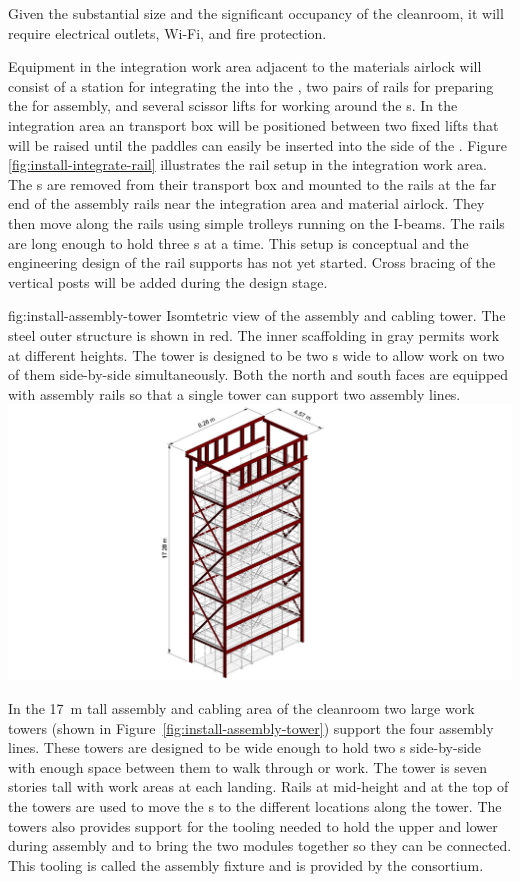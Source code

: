 Given the substantial size and the significant occupancy of the cleanroom, it will require electrical outlets, Wi-Fi, and fire protection. 

Equipment in the integration work area adjacent to the materials airlock will consist of a station for integrating the  into the , two pairs of rails for preparing the  for assembly, and several scissor lifts for working around the s. 
In the  integration area an  transport box will be positioned between two fixed lifts that will be raised until the  paddles can easily be inserted into the side of the . 
Figure \ref{fig:install-integrate-rail} illustrates the rail setup in the integration work area. 
The s are removed from their transport box and mounted to the rails at the far end of the assembly rails near the  integration area and material airlock. 
They then move along the rails using simple trolleys running on the I-beams. 
The rails are long enough to hold three s at a time. 
This setup is conceptual and the engineering design of the rail supports has not yet started. 
Cross bracing of the vertical posts will be added during the design stage. 

\begin{dunefigure}{fig:install-assembly-tower}
  {
  Isomtetric view of the  assembly and cabling tower. The steel outer structure is shown in red. The inner scaffolding in gray permits work at different heights.
  The tower is designed to be two s wide to allow work on two of them side-by-side simultaneously. 
  Both the north and south faces are equipped with assembly rails so that 
   a single tower can support two assembly lines.
  }
\includegraphics[width=.5\textwidth]{graphics/install-assembly-tower.pdf}
\end{dunefigure}


In the \SI{17}{m} tall   assembly and cabling area of the cleanroom two large work towers (shown in Figure~\ref{fig:install-assembly-tower}) support the four assembly lines. 
These towers are designed to be wide enough to hold two s  side-by-side with enough space between them to walk through or work. 
The tower is seven stories tall with work areas at each landing.
Rails at mid-height and at the top of the towers are used to move the s to the different locations along the tower. 
The towers also provides support for the tooling needed to hold the upper and lower  during assembly and to bring the two modules together so they can be connected. This tooling is called the  assembly fixture and is provided by the  consortium. 

